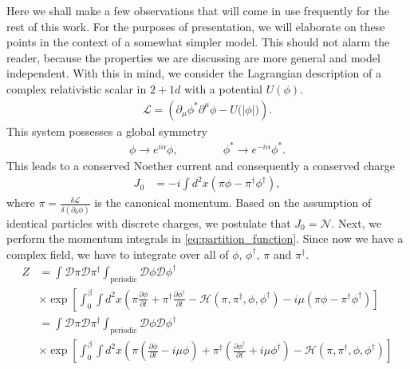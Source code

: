 Here we shall make a few observations that will come in use frequently for the rest of this work. For the purposes of presentation, we will elaborate on these points in the context of a somewhat simpler model. This should not alarm the reader, because the properties we are discussing are more general and model independent. With this in mind, we consider the Lagrangian description of a complex relativistic scalar in $2+1d$ with a potential $U(\phi)$.
        \begin{align}
            \mathcal{L} = \left(\partial_{\mu}\phi^{*} \partial^{\mu} \phi  - U\big(|\phi|\big)\right).
        \end{align}
        This system possesses a global symmetry
        \begin{align}
            \phi \rightarrow e^{i \alpha} \phi, \qquad\qquad \phi^* \rightarrow e^{-i \alpha} \phi^*.
        \end{align}
        This leads to a conserved Noether current and consequently a conserved charge
        \begin{align}
            J_{0} &= -i \int d^2x \left( \pi \phi - \pi^{\dag}\phi^{\dag}\right),
        \end{align}
        where $\pi = \frac{\delta \mathcal{L}}{\delta ( \partial_0 \phi)}$ is the canonical momentum. Based on the assumption of identical particles with discrete charges, we postulate that $J_0 = \mathcal{N}$. Next, we perform the momentum integrals in \eqref{eq:partition_function}. Since now we have a complex field, we have to integrate over all of $\phi$, $\phi^{\dag}$, $\pi$ and $\pi^{\dag}$.
        \begin{align}
            Z &= \int \mathcal{D} \pi \mathcal{D} \pi^{\dag} \int_{\text{periodic}} \mathcal{D} \phi \mathcal{D} \phi^{\dag} \nonumber \\
            &\times \exp \left[ \int_0^{\beta} \int d^2x \left(\pi \frac{\partial \phi}{\partial t} +\pi^{\dag} \frac{\partial \phi^{\dag}}{\partial t} - \mathcal{H}(\pi, \pi^{\dag}, \phi, \phi^{\dag}) - i  \mu \left(\pi \phi - \pi^{\dag}\phi^{\dag} \right) \right] \label{eq:partition_function_complex_scalar} \nonumber \\
            &= \int \mathcal{D} \pi \mathcal{D} \pi^{\dag} \int_{\text{periodic}} \mathcal{D} \phi \mathcal{D} \phi^{\dag} \nonumber \\
            &\times \exp \left[ \int_0^{\beta} \int d^2x \left(\pi \left( \frac{\partial \phi}{\partial t} -i \mu \phi \right) +\pi^{\dag} \left( \frac{\partial \phi^{\dag}}{\partial t} +i \mu \phi^{\dag} \right) - \mathcal{H}(\pi, \pi^{\dag}, \phi, \phi^{\dag})  \right] \label{eq:partition_function_complex_scalar}
        \end{align}
